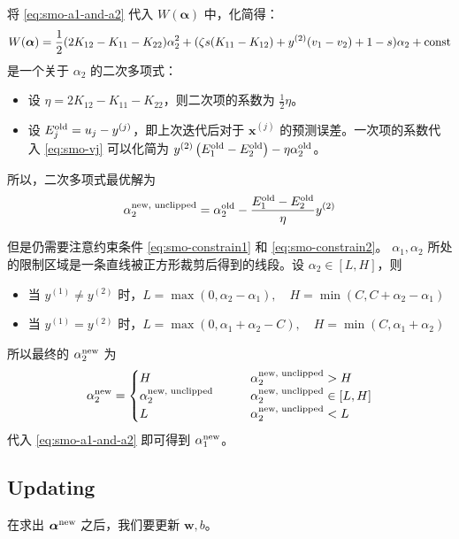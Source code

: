 		将 \eqref{eq:smo-a1-and-a2} 代入 $ W(\bm{\alpha}) $ 中，化简得：
		\begin{equation}
			W(\bm{\alpha}) = \frac{1}{2} (2K_{12} - K_{11} - K_{22}) \alpha_2^2 \\
			+ (\zeta s (K_{11} - K_{12}) + y^{(2)} (v_1 - v_2) + 1-s) \alpha_2 + \text{const}
		\end{equation}
		是一个关于 $ \alpha_2 $ 的二次多项式：
		\begin{itemize}
			\item 设 $ \eta = 2K_{12} - K_{11} - K_{22} $，则二次项的系数为 $ \frac{1}{2} \eta $。 
			\item 设 $ E_j^{\text{old}} = u_j - y^{(j)} $，即上次迭代后对于 $ \bm{x}^{(j)} $ 的预测误差。一次项的系数代入 \eqref{eq:smo-vj} 可以化简为 $ y^{(2)} \left( E_1^{\text{old}} - E_2^{\text{old}} \right) - \eta \alpha_2^{\text{old}} $。
		\end{itemize}
		
		所以，二次多项式最优解为
		\begin{equation}
			\alpha_2^\text{new, unclipped} = \alpha_2^{\text{old}} - \frac{ E_1^{\text{old}} - E_2^{\text{old}} }{\eta} y^{(2)}
		\end{equation}
		
		但是仍需要注意约束条件 \eqref{eq:smo-constrain1} 和 \eqref{eq:smo-constrain2}。 
		$ \alpha_1, \alpha_2 $ 所处的限制区域是一条直线被正方形裁剪后得到的线段。设 $ \alpha_2 \in [L, H]$，则
		\begin{itemize}
			\item 当 $ y^{(1)} \neq y^{(2)} $ 时，$ L = \max(0, \alpha_2 - \alpha_1), \quad H = \min(C, C + \alpha_2 - \alpha_1) $ 
			\item 当 $ y^{(1)} = y^{(2)} $ 时，$ L = \max(0, \alpha_1 + \alpha_2 - C), \quad H = \min(C, \alpha_1 + \alpha_2) $
		\end{itemize}
		
		所以最终的 $ \alpha_2^{\text{new}} $ 为
		\begin{equation*}
			\alpha_2^{\text{new}} = 
			\begin{cases}
				H &\qquad \alpha_2^\text{new, unclipped} > H \\
				\alpha_2^\text{new, unclipped} &\qquad \alpha_2^\text{new, unclipped} \in [L, H] \\
				L &\qquad \alpha_2^\text{new, unclipped} < L
			\end{cases}
		\end{equation*}
		代入 \eqref{eq:smo-a1-and-a2} 即可得到 $ \alpha_1^{\text{new}} $。
		
	\subsection{Updating} 
		在求出 $ \bm{\alpha}^{\text{new}} $ 之后，我们要更新 $ \bm{w}, b $。
		

